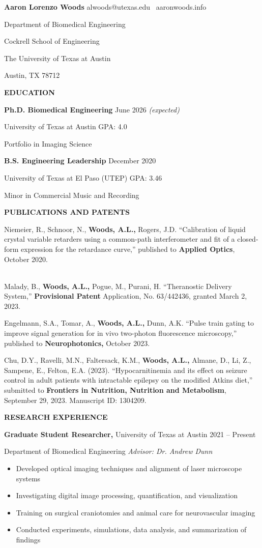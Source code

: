 \documentclass[
]{article}
\author{}
\date{}
\begin{document}
\textbf{Aaron Lorenzo Woods} alwoods@utexas.edu~\textbar{} aaronwoods.info

Department of Biomedical Engineering

Cockrell School of Engineering

The University of Texas at Austin

Austin, TX 78712

\textbf{EDUCATION}

\textbf{Ph.D. Biomedical Engineering} June 2026 \emph{(expected)}

University of Texas at Austin GPA: 4.0

Portfolio in Imaging Science

\textbf{B.S. Engineering Leadership} December 2020

University of Texas at El Paso (UTEP) GPA: 3.46

Minor in Commercial Music and Recording

\textbf{PUBLICATIONS AND PATENTS}

Niemeier, R., Schnoor, N., \textbf{Woods, A.L.,} Rogers, J.D. ``Calibration of liquid crystal variable retarders using a common-path interferometer and fit of a closed-form expression for the retardance curve,'' published to \textbf{Applied Optics}, October 2020.\\
\strut \\
Malady, B., \textbf{Woods, A.L.,} Pogue, M., Purani, H. ``Theranostic Delivery System,'' \textbf{Provisional Patent} Application, No. 63/442436, granted March 2, 2023.

Engelmann, S.A., Tomar, A., \textbf{Woods, A.L.,} Dunn, A.K. ``Pulse train gating to improve signal generation for in vivo two-photon fluorescence microscopy,'' published to \textbf{Neurophotonics,} October 2023.

Chu, D.Y., Ravelli, M.N., Faltersack, K.M., \textbf{Woods, A.L.,} Almane, D., Li, Z., Sampene, E., Felton, E.A. (2023). ``Hypocarnitinemia and its effect on seizure control in adult patients with intractable epilepsy on the modified Atkins diet,'' submitted to \textbf{Frontiers in Nutrition, Nutrition and Metabolism}, September 29, 2023. Manuscript ID: 1304209.

\textbf{RESEARCH EXPERIENCE}

\textbf{Graduate Student Researcher,} University of Texas at Austin 2021 -- Present

Department of Biomedical Engineering \textbar{} \emph{Advisor: Dr. Andrew Dunn}

\begin{itemize}
\item
  Developed optical imaging techniques and alignment of laser microscope systems
\item
  Investigating digital image processing, quantification, and visualization
\item
  Training on surgical craniotomies and animal care for neurovascular imaging
\item
  Conducted experiments, simulations, data analysis, and summarization of findings
\end{itemize}
\end{document}
